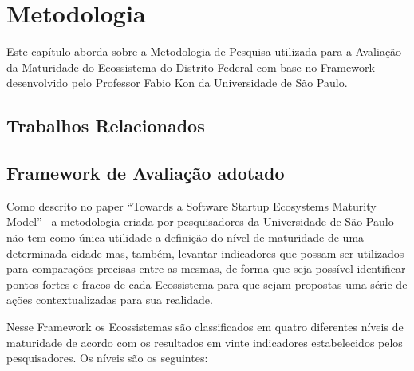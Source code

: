 \chapter[Metodologia]{Metodologia}
\label{cap-metodologia}

Este capítulo aborda sobre a Metodologia de Pesquisa utilizada para a Avaliação da Maturidade do Ecossistema do Distrito Federal com base no Framework desenvolvido
pelo Professor Fabio Kon da Universidade de São Paulo.

\section{Trabalhos Relacionados}
\label{section:trabalhos_relacionados}

\section{Framework de Avaliação adotado}
\label{section:framework_adotado}

Como descrito no paper ``Towards a Software Startup Ecosystems Maturity Model''~ a metodologia criada por pesquisadores da Universidade de São Paulo não tem como única utilidade
a definição do nível de maturidade de uma determinada cidade mas, também, levantar indicadores que possam ser utilizados para comparações precisas entre as mesmas, de forma que seja possível
identificar pontos fortes e fracos de cada Ecossistema para que sejam propostas uma série de ações contextualizadas para sua realidade.

Nesse Framework os Ecossistemas são classificados em quatro diferentes níveis de maturidade de acordo com os resultados em vinte indicadores estabelecidos pelos pesquisadores. Os níveis são os seguintes:

